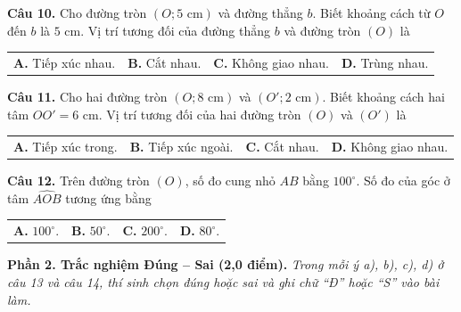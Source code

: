 \documentclass[11pt,a4paper]{article}
\begin{document}
\vspace{1.5mm}
\textbf{Câu 10.} Cho đường tròn $(O; 5\text{ cm})$ và đường thẳng $b$. Biết khoảng cách từ $O$ đến $b$ là $5\text{ cm}$. Vị trí tương đối của đường thẳng $b$ và đường tròn $(O)$ là\\
\begin{tabularx}{\linewidth}{XXXX}
\textbf{A.} Tiếp xúc nhau. & \textbf{B.} Cắt nhau. & \textbf{C.} Không giao nhau. & \textbf{D.} Trùng nhau.
\end{tabularx}

\vspace{1.5mm}
\textbf{Câu 11.} Cho hai đường tròn $(O; 8\text{ cm})$ và $(O'; 2\text{ cm})$. Biết khoảng cách hai tâm $OO' = 6\text{ cm}$. Vị trí tương đối của hai đường tròn $(O)$ và $(O')$ là\\
\begin{tabularx}{\linewidth}{XXXX}
\textbf{A.} Tiếp xúc trong. & \textbf{B.} Tiếp xúc ngoài. & \textbf{C.} Cắt nhau. & \textbf{D.} Không giao nhau.
\end{tabularx}

\vspace{1.5mm}
\textbf{Câu 12.} Trên đường tròn $(O)$, số đo cung nhỏ $AB$ bằng $100^\circ$. Số đo của góc ở tâm $\widehat{AOB}$ tương ứng bằng\\
\begin{tabularx}{\linewidth}{XXXX}
\textbf{A.} $100^\circ$. & \textbf{B.} $50^\circ$. & \textbf{C.} $200^\circ$. & \textbf{D.} $80^\circ$.
\end{tabularx}

\vspace{3mm}
\noindent
\textbf{Phần 2. Trắc nghiệm Đúng -- Sai (2,0 điểm).} \textit{Trong mỗi ý a), b), c), d) ở câu 13 và câu 14, thí sinh chọn đúng hoặc sai và ghi chữ ``Đ'' hoặc ``S'' vào bài làm.}
\end{document}
